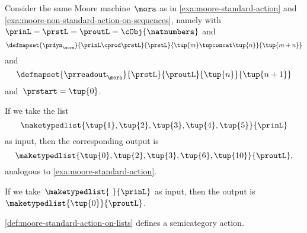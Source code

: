 \begin{example}
    \label{exa:moore-non-standard-action-on-lists}
    Consider the same Moore machine~$\mora$ as in \cref{exa:moore-standard-action} and \cref{exa:moore-non-standard-action-on-sequences}, namely with~$\prinL = \prstL = \proutL = \cObj{\natnumbers}$
    and
    \begin{equation}
        \defmapset{
            \prdyn_\mora
        }{
            \prinL \cprod \prstL
        }{
            \prstL
        }{
            \tup{m} \tupconcat \tup{n}
        }{
            \tup{m + n}
        }
    \end{equation}
    and
    \begin{equation}
        \defmapset{
            \prreadout_\mora
        }{
            \prstL
        }{
            \proutL
        }{
            \tup{n}
        }{
            \tup{n+1}
        }
    \end{equation}
    and~$\prstart = \tup{0}$.

    If we take the list
    \begin{equation}
        \maketypedlist{\tup{1}, \tup{2}, \tup{3}, \tup{4}, \tup{5}}{\prinL}
    \end{equation}
    as input, then the corresponding output is
    \begin{equation}
        \maketypedlist{\tup{0}, \tup{2}, \tup{3}, \tup{6}, \tup{10}}{\proutL},
    \end{equation}
    analogous to \cref{exa:moore-standard-action}.

    If we take~$\maketypedlist{\ }{\prinL}$ as input, then the output is~$\maketypedlist{\tup{0}}{\proutL}$.
\end{example}


\begin{lemma}
    \cref{def:moore-standard-action-on-lists} defines a semicategory action.
\end{lemma}

